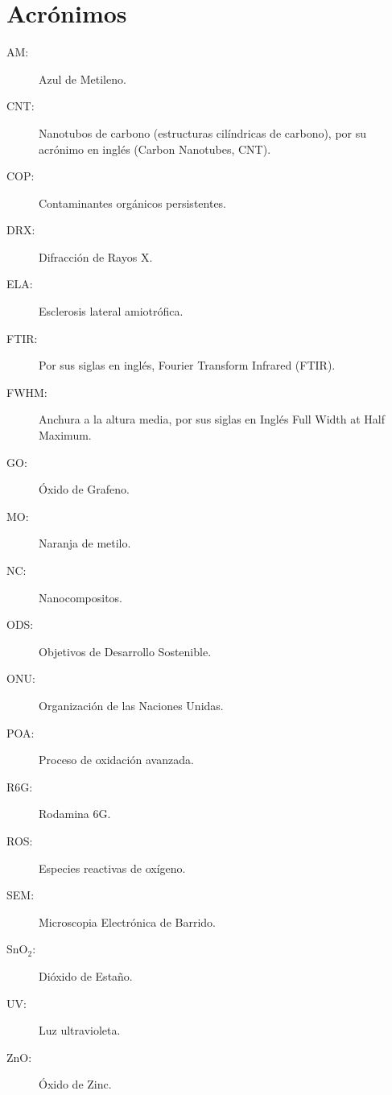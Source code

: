 \documentclass[12pt]{article}
\begin{document}
 \section*{Acrónimos}
\begin{description}
    \item[AM:] Azul de Metileno.
    \item[CNT:] Nanotubos de carbono (estructuras cilíndricas de carbono), por su acrónimo en inglés (Carbon Nanotubes, CNT).
    \item[COP:] Contaminantes orgánicos persistentes.
    \item[DRX:] Difracción de Rayos X.
    \item[ELA:] Esclerosis lateral amiotrófica.
    \item[FTIR:] Por sus siglas en inglés, Fourier Transform Infrared (FTIR).
    \item[FWHM:] Anchura a la altura media, por sus siglas en Inglés Full Width at Half Maximum.
    \item[GO:] Óxido de Grafeno.
    \item[MO:] Naranja de metilo.
    \item[NC:] Nanocompositos.
    \item[ODS:] Objetivos de Desarrollo Sostenible.
    \item[ONU:] Organización de las Naciones Unidas.
    \item[POA:] Proceso de oxidación avanzada.
    \item[R6G:] Rodamina 6G.
    \item[ROS:] Especies reactivas de oxígeno.
    \item[SEM:] Microscopia Electrónica de Barrido.
    \item[SnO$\displaystyle _{2}$:] Dióxido de Estaño.
    \item[UV:] Luz ultravioleta.
    \item[ZnO:] Óxido de Zinc.
\end{description}
\end{document}
